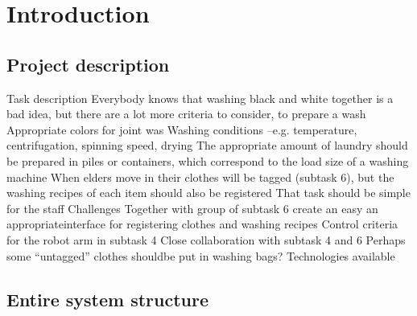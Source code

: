 \section{Introduction}

\subsection{Project description}

Task description
Everybody knows that washing black and white together is a bad idea, but there are a lot more criteria to consider, to prepare a wash
Appropriate colors for joint was
Washing conditions –e.g. temperature, centrifugation, spinning speed, drying
The appropriate amount of laundry should be prepared in piles or containers, which correspond to the load size of a washing machine
When elders move in their clothes will be tagged (subtask 6), but the washing recipes of each item should also be registered
That task should be simple for the staff
Challenges
Together with group of subtask 6 create an easy an appropriateinterface for registering clothes and washing recipes
Control criteria for the robot arm in subtask 4
Close collaboration with subtask 4 and 6
Perhaps some “untagged” clothes shouldbe put in washing bags?
Technologies available

\subsection{Entire system structure}